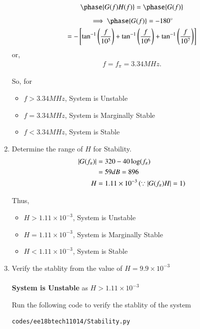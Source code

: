 \begin{enumerate}[label=\thesection.\arabic*.,ref=\thesection.\theenumi]
\begin{align}
\phase{G(f)H(f)} = \phase{G(f)}
\end{align}
\begin{multline}
\implies \phase{G(f)} = -180\degree
\\
=-\sbrak{\tan ^{-1}\brak{\frac{f}{10^{5}}}+\tan ^{-1}\brak{\frac{f}{10^{6}}}+\tan ^{-1}\brak{\frac{f}{10^{7}}}}
\end{multline}
or,
\begin{align}
f = f_{\pi} = 3.34 M Hz.
\end{align}

So, for 
\begin{itemize}
\item $f > 3.34 M Hz$, System is Unstable
\item $f = 3.34 M Hz$, System is Marginally Stable
\item $f < 3.34 M Hz$, System is Stable
\end{itemize}
\item Determine the range of $H$ for Stability.\\
\solution
\begin{align}
\left\vert G(f_{\pi})\right\vert &= 320 - 40\log(f_{\pi})\\
 &= 59 dB = 896\\
H &= 1.11 \times 10^{-3} \left(\because \left\vert G(f_{\pi})H\right\vert = 1\right)
\end{align}


Thus, 
\begin{itemize}
\item $H > 1.11 \times 10^{-3}$, System is Unstable
\item $H = 1.11 \times 10^{-3}$, System is Marginally Stable
\item $H < 1.11 \times 10^{-3}$, System is Stable
\end{itemize}

\item Verify the stablity from the value of $H=9.9\times 10^{-3}$\\
\solution\\
\textbf{System is Unstable} as $H>1.11\times 10^{-3}$

Run the following code to verify the stablity of the system
\begin{lstlisting}
codes/ee18btech11014/Stability.py
\end{lstlisting}


\end{enumerate}
